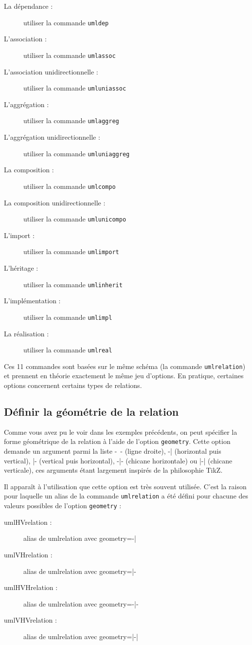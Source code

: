 \documentclass[a4paper,11pt]{report}
\begin{document}
\begin{description}
\item[La dépendance :] utiliser la commande {\tt umldep}
\item[L'association :] utiliser la commande {\tt umlassoc}
\item[L'association unidirectionnelle :] utiliser la commande {\tt umluniassoc}
\item[L'aggrégation :] utiliser la commande {\tt umlaggreg}
\item[L'aggrégation unidirectionnelle :] utiliser la commande {\tt umluniaggreg}
\item[La composition :] utiliser la commande {\tt umlcompo}
\item[La composition unidirectionnelle :] utiliser la commande {\tt umlunicompo}
\item[L'import :] utiliser la commande {\tt umlimport}
\item[L'héritage :] utiliser la commande {\tt umlinherit}
\item[L'implémentation :] utiliser la commande {\tt umlimpl}
\item[La réalisation :] utiliser la commande {\tt umlreal}
\end{description}

Ces 11 commandes sont basées sur le même schéma (la commande {\tt umlrelation}) et prennent en théorie exactement le même jeu d'options. En pratique, certaines options concernent certains types de relations.

\subsection{Définir la géométrie de la relation}

Comme vous avez pu le voir dans les exemples précédents, on peut spécifier la forme géométrique de la relation à l'aide de l'option {\tt geometry}. Cette option demande un argument parmi la liste -~- (ligne droite), -| (horizontal puis vertical), |- (vertical puis horizontal), -|- (chicane horizontale) ou |-| (chicane verticale), ces arguments étant largement inspirés de la philosophie TikZ.

Il apparaît à l'utilisation que cette option est très souvent utilisée. C'est la raison pour laquelle un alias de la commande {\tt umlrelation} a été défini pour chacune des valeurs possibles de l'option {\tt geometry} :

\begin{description}
\item[umlHVrelation :] alias de umlrelation avec geometry=-|
\item[umlVHrelation :] alias de umlrelation avec geometry=|-
\item[umlHVHrelation :] alias de umlrelation avec geometry=-|-
\item[umlVHVrelation :] alias de umlrelation avec geometry=|-|
\end{description}
\end{document}
